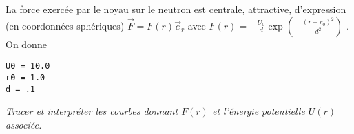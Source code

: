 La force exercée par le noyau sur le neutron est centrale, attractive, d’expression (en coordonnées sphériques)
$\displaystyle \vec F = F(r)\vec e_r$ avec $\displaystyle  F(r) = -\frac{U_0}d \exp\left(-\frac{(r - r_0)^2}{d^2}\right)$ .
On donne
\begin{lstlisting}
U0 = 10.0
r0 = 1.0
d = .1
\end{lstlisting}
\begin{Exercise}\it
Tracer et interpréter les courbes donnant $F(r)$ et l’énergie potentielle $U(r)$ associée.
\end{Exercise}
\begin{Answer}
\end{Answer}
